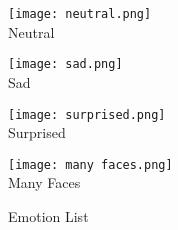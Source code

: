 \documentclass[a4paper,13pt]{report}
\begin{document}
\begin{figure}[H]
    \begin{minipage}{0.19\textwidth}
        \centering
        \texttt{[image: neutral.png]} \\ %
        \vspace{3pt}
        \small Neutral
    \end{minipage}
    \hspace{5pt} %
    \begin{minipage}{0.19\textwidth}
        \centering
        \texttt{[image: sad.png]} \\ %
        \vspace{3pt}
        \small Sad
    \end{minipage}
    \hspace{5pt}
    \begin{minipage}{0.19\textwidth}
        \centering
        \texttt{[image: surprised.png]} \\ %
        \vspace{3pt}
        \small Surprised
    \end{minipage}
    \hspace{5pt}
    \begin{minipage}{0.24\textwidth} %
        \centering
        \texttt{[image: many faces.png]} \\ %
        \vspace{3pt}
        \small Many Faces
    \end{minipage}

    \vspace{10pt} %
    \caption{Emotion List} %
    \label{fig:emotion_list}
\end{figure}


\end{document}
